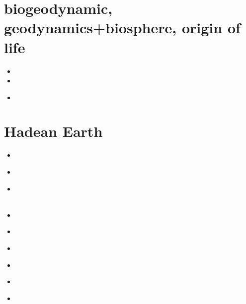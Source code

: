 \section{biogeodynamic, geodynamics+biosphere, origin of life}

\begin{small}
\begin{itemize}
\item[\twothousandthirteen]
\item[\twothousandeighteen]
\item[\twothousandtwentythree]
 \\
\end{itemize}
\end{small}


\section{Hadean Earth}

\begin{small}
\begin{itemize}
\item[\twothousandseven]     
 \\
\item[\twothousandthirteen]       
 \\ 
\item[\twothousandfourteen]       
 \\ 
 \\ 
\item[\twothousandsixteen] 
\item[\twothousandseventeen] 
 \\ 
\item[\twothousandeighteen] 
\item[\twothousandtwenty]
 \\ 
\item[\twothousandtwentyone]
\item[\twothousandtwentytwo]
 \\
\end{itemize}
\end{small}


